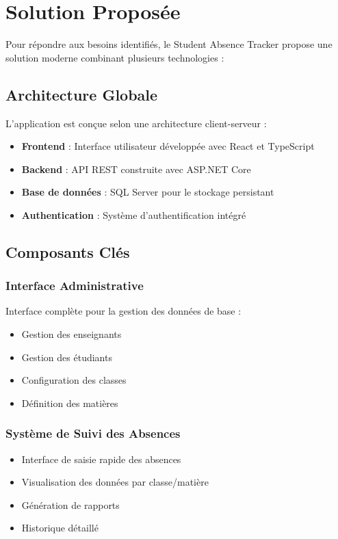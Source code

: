 \section{Solution Proposée}
\label{sec:solution_proposee}

Pour répondre aux besoins identifiés, le Student Absence Tracker propose une solution moderne combinant plusieurs technologies :

\subsection{Architecture Globale}
L'application est conçue selon une architecture client-serveur :

\begin{itemize}
    \item \textbf{Frontend} : Interface utilisateur développée avec React et TypeScript
    \item \textbf{Backend} : API REST construite avec ASP.NET Core
    \item \textbf{Base de données} : SQL Server pour le stockage persistant
    \item \textbf{Authentication} : Système d'authentification intégré
\end{itemize}

\subsection{Composants Clés}

\subsubsection{Interface Administrative}
Interface complète pour la gestion des données de base :
\begin{itemize}
    \item Gestion des enseignants
    \item Gestion des étudiants
    \item Configuration des classes
    \item Définition des matières
\end{itemize}

\subsubsection{Système de Suivi des Absences}
\begin{itemize}
    \item Interface de saisie rapide des absences
    \item Visualisation des données par classe/matière
    \item Génération de rapports
    \item Historique détaillé
\end{itemize}

